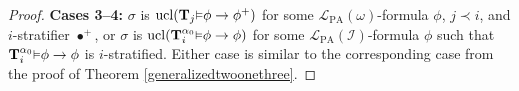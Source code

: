 \documentclass[reqno]{article}
\theoremstyle{definition}
\def\L{\mathscr{L}}
\def\M{\mathscr{M}}
\def\T{\mathbf{T}}
\def\U{\mathbf{U}}
\def\LPA{\L_{\mathrm{PA}}}
\def\indset{\mathcal I}
\def\Tr{\mathrm{Tr}}
\def\ctr{\cap\Tr}
\def\myequiv{\equiv}
\renewcommand{\Pr}[1]{\T_{#1}\mbox{\small${\vDash}$}}
\newcommand{\Prr}[2]{\T^{#1}_{#2}\mbox{\small${\vDash}$}}
\newcommand{\ucl}[1]{\mathrm{ucl}(#1)}
\newcommand{\case}[1]{\textbf{Case #1:}}
\newcommand{\caseplural}[1]{\textbf{Cases #1:}}
\newcommand{\str}[1]{\mathrm{Str}(#1)} \newcommand{\Str}[1]{\str{#1}}
\begin{document}
\begin{proof}
%
%
%


\item
\caseplural{3--4}
$\sigma$ is $\ucl{\Pr j\phi\rightarrow\phi^+}$ for some $\LPA(\omega)$-formula $\phi$, $j\prec i$,
and $i$-stratifier $\bullet^+$, or $\sigma$
is $\ucl{\Prr{\alpha_0} i\phi\rightarrow\phi}$ for some $\LPA(\indset)$-formula $\phi$
such that $\Prr{\alpha_0}i\phi\rightarrow\phi$ is $i$-stratified.
Either case is similar to the corresponding case from the proof of Theorem \ref{generalizedtwoonethree}.


\end{proof}
\end{document}
